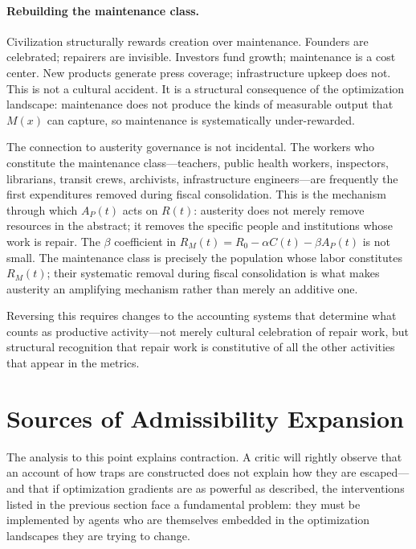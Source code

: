 \documentclass[11pt, letterpaper]{article}
\begin{document}
\paragraph{Rebuilding the maintenance class.} Civilization structurally rewards creation over maintenance. Founders are celebrated; repairers are invisible. Investors fund growth; maintenance is a cost center. New products generate press coverage; infrastructure upkeep does not. This is not a cultural accident. It is a structural consequence of the optimization landscape: maintenance does not produce the kinds of measurable output that $M(x)$ can capture, so maintenance is systematically under-rewarded.

The connection to austerity governance is not incidental. The workers who constitute the maintenance class---teachers, public health workers, inspectors, librarians, transit crews, archivists, infrastructure engineers---are frequently the first expenditures removed during fiscal consolidation. This is the mechanism through which $A_P(t)$ acts on $R(t)$: austerity does not merely remove resources in the abstract; it removes the specific people and institutions whose work is repair. The $\beta$ coefficient in $R_M(t) = R_0 - \alpha C(t) - \beta A_P(t)$ is not small. The maintenance class is precisely the population whose labor constitutes $R_M(t)$; their systematic removal during fiscal consolidation is what makes austerity an amplifying mechanism rather than merely an additive one.

Reversing this requires changes to the accounting systems that determine what counts as productive activity---not merely cultural celebration of repair work, but structural recognition that repair work is constitutive of all the other activities that appear in the metrics.

\section{Sources of Admissibility Expansion}

The analysis to this point explains contraction. A critic will rightly observe that an account of how traps are constructed does not explain how they are escaped---and that if optimization gradients are as powerful as described, the interventions listed in the previous section face a fundamental problem: they must be implemented by agents who are themselves embedded in the optimization landscapes they are trying to change.
\end{document}
